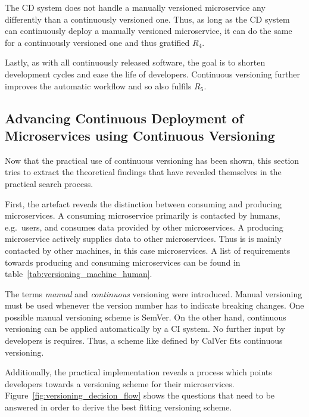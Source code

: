 The \ac{CD} system does not handle a manually versioned microservice any
differently than a continuously versioned one. Thus, as long as the \ac{CD}
system can continuously deploy a manually versioned microservice, it can do the
same for a continuously versioned one and thus gratified $R_4$.

Lastly, as with all continuously released software, the goal is to shorten
development cycles and ease the life of developers. Continuous versioning
further improves the automatic workflow and so also fulfils $R_5$.


\subsection{Advancing Continuous Deployment of Microservices using Continuous Versioning}%
\label{sub:Advancing_Continuous_Deployment_of_Microservices_using_XXX_Versioning}
Now that the practical use of continuous versioning has been shown, this
section tries to extract the theoretical findings that have revealed themselves
in the practical search process.

First, the artefact reveals the distinction between consuming and producing
microservices. A consuming microservice primarily is contacted by humans, e.g.\
users, and consumes data provided by other microservices. A producing
microservice actively supplies data to other microservices. Thus is is mainly
contacted by other machines, in this case microservices. A list of requirements
towards producing and consuming microservices can be found in
table~\ref{tab:versioning_machine_human}.

The terms \textit{manual} and \textit{continuous} versioning were introduced.
Manual versioning must be used whenever the version number has to indicate
breaking changes. One possible manual versioning scheme is SemVer. On the other
hand, continuous versioning can be applied automatically by a \ac{CI} system.
No further input by developers is requires. Thus, a scheme like defined by
CalVer fits continuous versioning.

Additionally, the practical implementation reveals a process which points
developers towards a versioning scheme for their microservices.
Figure~\ref{fig:versioning_decision_flow} shows the questions that need to be
answered in order to derive the best fitting versioning scheme.

